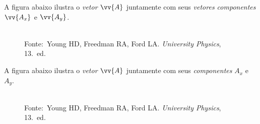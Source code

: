 \documentclass[pdftex, brazil, 12pt, oneside, addpoints]{exam}
\newcommand{\umalinha}{\fillwithlines{0.25in}}
\newcommand{\quatrolinhas}{\fillwithlines{1.00in}}
\newcommand{\vetor}[1]{\ensuremath{\vv{#1}}}
\begin{document}
\begin{questions}
\question
A figura abaixo ilustra o \emph{vetor} \vetor{A} juntamente com seus
\emph{vetores componentes} \vetor{A_x} e \vetor{A_y}.
\begin{figure}[H]
  \begin{center}
    \\
    \footnotesize{Fonte:~Young HD, Freedman RA, Ford
      LA. \emph{University Physics}, 13.\ ed.}
  \end{center}
\end{figure}
\vspace{-0.7cm}

\question
A figura abaixo ilustra o \emph{vetor} \vetor{A} juntamente com seus
\emph{componentes} $A_x$ e $A_y$.
\begin{figure}[H]
  \begin{center}
    \\
    \footnotesize{Fonte:~Young HD, Freedman RA, Ford
      LA. \emph{University Physics}, 13.\ ed.}
  \end{center}
\end{figure}
\vspace{-0.7cm}
\begin{parts}

\end{parts}
\end{questions}
\end{document}
